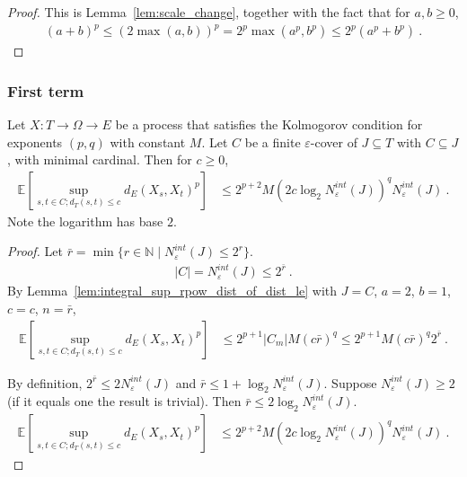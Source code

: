 \begin{proof}
This is Lemma~\ref{lem:scale_change}, together with the fact that for $a, b \ge 0$,
\begin{align*}
  (a + b)^p \le (2\max(a,b))^p = 2^p \max(a^p,b^p) \le 2^p (a^p + b^p)
  \: .
\end{align*}
\end{proof}



\subsubsection{First term}


\begin{lemma}\label{lem:integral_sup_rpow_dist_cover_of_dist_le}
  \leanok
Let $X : T \to \Omega \to E$ be a process that satisfies the Kolmogorov condition for exponents $(p,q)$ with constant $M$.
Let $C$ be a finite $\varepsilon$-cover of $J \subseteq T$ with $C \subseteq J$, with minimal cardinal.
Then for $c \ge 0$,
\begin{align*}
  \mathbb{E} \left[ \sup_{s, t \in C; d_T(s, t) \le c} d_E(X_s, X_t)^p \right]
  &\le 2^{p+2} M \left(2 c \log_2 N^{int}_{\varepsilon}(J) \right)^q  N^{int}_{\varepsilon}(J)
  \: .
\end{align*}
Note the logarithm has base $2$.
\end{lemma}

\begin{proof}
Let $\bar{r} = \min\{r \in \mathbb{N} \mid N^{int}_{\varepsilon}(J) \le 2^r\}$.
\begin{align*}
  \vert C \vert
  = N^{int}_{\varepsilon}(J)
  \le 2^{\bar{r}}
  \: .
\end{align*}
By Lemma~\ref{lem:integral_sup_rpow_dist_of_dist_le} with $J = C$, $a = 2$, $b = 1$, $c = c$, $n = \bar{r}$,
\begin{align*}
  \mathbb{E} \left[ \sup_{s, t \in C; d_T(s, t) \le c} d_E(X_s, X_t)^p \right]
  &\le 2^{p+1} |C_m| M (c \bar{r})^q
  \le 2^{p+1} M (c \bar{r})^q  2^{\bar{r}}
  \: .
\end{align*}

By definition, $2^{\bar{r}} \le 2 N^{int}_{\varepsilon}(J)$ and $\bar{r} \le 1 + \log_2 N^{int}_{\varepsilon}(J)$.
Suppose $N^{int}_{\varepsilon}(J) \ge 2$ (if it equals one the result is trivial).
Then $\bar{r} \le 2 \log_2 N^{int}_{\varepsilon}(J)$.
\begin{align*}
  \mathbb{E} \left[ \sup_{s, t \in C; d_T(s, t) \le c} d_E(X_s, X_t)^p \right]
  &\le 2^{p+2} M \left(2 c \log_2 N^{int}_{\varepsilon}(J) \right)^q  N^{int}_{\varepsilon}(J)
  \: .
\end{align*}
\end{proof}


